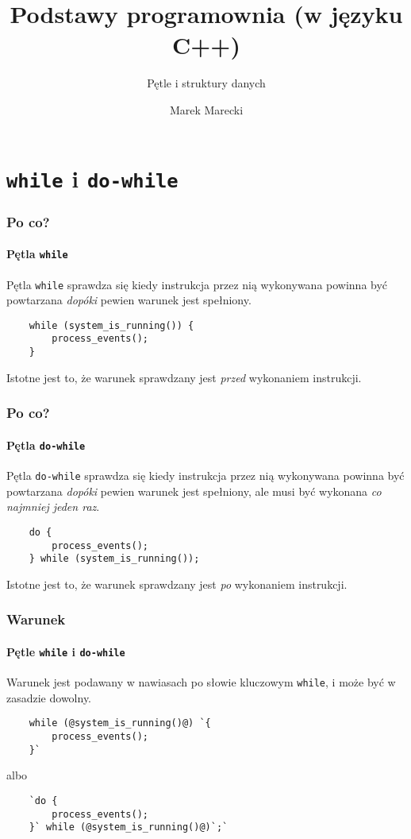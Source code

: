 \documentclass[aspectratio=169]{beamer}
\title{Podstawy programownia (w języku C++)}
\subtitle{Pętle i struktury danych}
\author{Marek Marecki}
\institute{Polsko-Japońska Akademia Technik Komputerowych}
\begin{document}
{%
    \frame{\titlepage}
}

\section{{\tt while} i {\tt do-while}}

\begin{frame}[fragile]
    \frametitle{Po co?}
    \framesubtitle{Pętla {\tt while}}

    Pętla {\tt while} sprawdza się kiedy instrukcja przez nią wykonywana powinna
    być powtarzana \emph{dopóki} pewien warunek jest spełniony.

    \begin{lstlisting}
    while (system_is_running()) {
        process_events();
    }
    \end{lstlisting}

    Istotne jest to, że warunek sprawdzany jest \emph{przed} wykonaniem
    instrukcji.
\end{frame}

\begin{frame}[fragile]
    \frametitle{Po co?}
    \framesubtitle{Pętla {\tt do-while}}

    Pętla {\tt do-while} sprawdza się kiedy instrukcja przez nią wykonywana powinna
    być powtarzana \emph{dopóki} pewien warunek jest spełniony, ale musi być
    wykonana \emph{co najmniej jeden raz}.

    \begin{lstlisting}
    do {
        process_events();
    } while (system_is_running());
    \end{lstlisting}

    Istotne jest to, że warunek sprawdzany jest \emph{po} wykonaniem
    instrukcji.
\end{frame}

\begin{frame}[fragile]
    \frametitle{Warunek}
    \framesubtitle{Pętle {\tt while} i {\tt do-while}}

    Warunek jest podawany w nawiasach po słowie kluczowym {\tt while}, i może
    być w zasadzie dowolny.

    \begin{lstlisting}
    while (@system_is_running()@) `{
        process_events();
    }`
    \end{lstlisting}

    albo

    \begin{lstlisting}
    `do {
        process_events();
    }` while (@system_is_running()@)`;`
    \end{lstlisting}
\end{frame}
\end{document}
